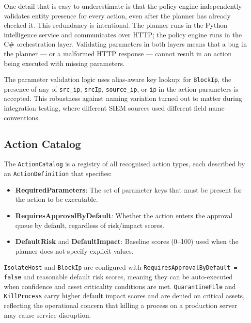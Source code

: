 One detail that is easy to underestimate is that the policy engine independently validates entity presence for every action, even after the planner has already checked it. This redundancy is intentional. The planner runs in the Python intelligence service and communicates over HTTP; the policy engine runs in the C\# orchestration layer. Validating parameters in both layers means that a bug in the planner --- or a malformed HTTP response --- cannot result in an action being executed with missing parameters.

The parameter validation logic uses alias-aware key lookup: for \texttt{BlockIp}, the presence of any of \texttt{src\_ip}, \texttt{srcIp}, \texttt{source\_ip}, or \texttt{ip} in the action parameters is accepted. This robustness against naming variation turned out to matter during integration testing, where different SIEM sources used different field name conventions.

\subsection{Action Catalog}

The \texttt{ActionCatalog} is a registry of all recognised action types, each described by an \texttt{ActionDefinition} that specifies:

\begin{itemize}
    \item \textbf{RequiredParameters}: The set of parameter keys that must be present for the action to be executable.
    \item \textbf{RequiresApprovalByDefault}: Whether the action enters the approval queue by default, regardless of risk/impact scores.
    \item \textbf{DefaultRisk} and \textbf{DefaultImpact}: Baseline scores (0--100) used when the planner does not specify explicit values.
\end{itemize}

\texttt{IsolateHost} and \texttt{BlockIp} are configured with \texttt{RequiresApprovalByDefault = false} and reasonable default risk scores, meaning they can be auto-executed when confidence and asset criticality conditions are met. \texttt{QuarantineFile} and \texttt{KillProcess} carry higher default impact scores and are denied on critical assets, reflecting the operational concern that killing a process on a production server may cause service disruption.

